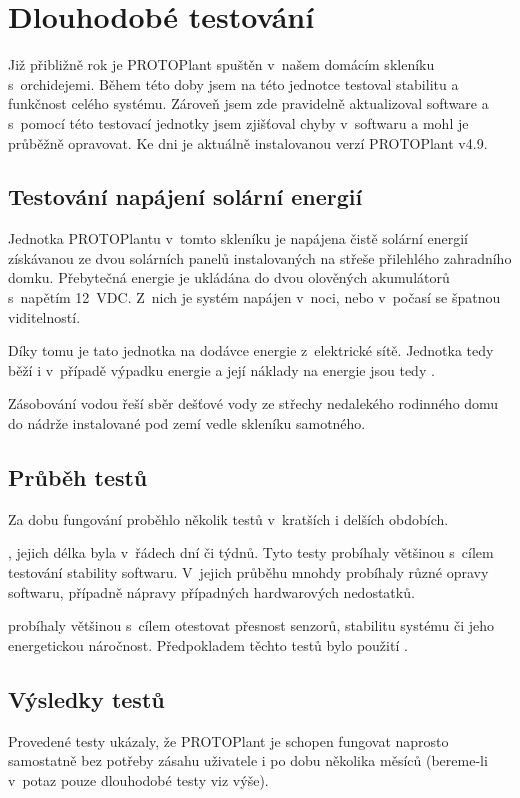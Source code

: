 \chapter{Dlouhodobé testování}
Již přibližně rok je PROTOPlant spuštěn v~našem domácím skleníku s~orchidejemi.
Během této doby jsem na této jednotce testoval stabilitu a funkčnost celého systému. 
Zároveň jsem zde pravidelně aktualizoval software a s~pomocí této testovací jednotky jsem zjišťoval chyby v~softwaru a mohl je průběžně opravovat.
Ke dni  je aktuálně instalovanou verzí PROTOPlant v4.9.

\section{Testování napájení solární energií}
\label{sec:SolarPower}
Jednotka PROTOPlantu v~tomto skleníku je napájena čistě solární energií získávanou ze dvou solárních panelů instalovaných na střeše přilehlého zahradního domku.
Přebytečná energie je ukládána do dvou olověných akumulátorů s~napětím 12~VDC.
Z~nich je systém napájen v~noci, nebo v~počasí se špatnou viditelností.

Díky tomu je tato jednotka  na dodávce energie z~elektrické sítě.
Jednotka tedy běží i v~případě výpadku energie a její náklady na energie jsou tedy .

Zásobování vodou řeší sběr dešťové vody ze střechy nedalekého rodinného domu do nádrže instalované pod zemí vedle skleníku samotného.

\section{Průběh testů}
Za dobu fungování proběhlo několik testů v~kratších i delších obdobích. \newline

\noindent{}, jejich délka byla v~řádech dní či týdnů. 
Tyto testy probíhaly většinou s~cílem testování stability softwaru.
V~jejich průběhu mnohdy probíhaly různé opravy softwaru, případně nápravy případných hardwarových nedostatků. \newline

\noindent{} probíhaly většinou s~cílem otestovat přesnost senzorů, stabilitu systému či jeho energetickou náročnost.
Předpokladem těchto testů bylo použití . 

\section{Výsledky testů}
Provedené testy ukázaly, že PROTOPlant je schopen fungovat naprosto samostatně bez potřeby zásahu uživatele i po dobu několika měsíců (bereme-li v~potaz pouze dlouhodobé testy viz výše).

\newpage